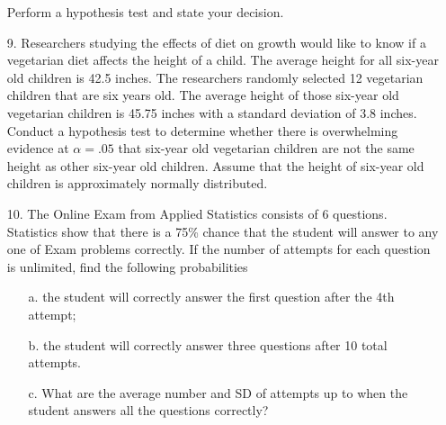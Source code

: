 \documentclass[letterpaper,12pt]{article}
\begin{document}
\begin{enumerate}
    Perform a hypothesis test and state your decision.
  \item[9.]
    Researchers studying the effects of diet on growth would like to know if a vegetarian diet affects the height of a child. The average height for all six-year old children is 42.5 inches. The researchers randomly selected 12 vegetarian children that are six years old. The average height of those six-year old vegetarian children is 45.75 inches with a standard deviation of 3.8 inches. Conduct a hypothesis test to determine whether there is overwhelming evidence at $\alpha = .05$ that six-year old vegetarian children are not the same height as other six-year old children. Assume that the height of six-year old children is approximately normally distributed.
  \item[10.]
    The Online Exam from Applied Statistics consists of 6 questions. Statistics show that there is a 75\% chance that the student will answer to any one of Exam problems correctly. If the number of attempts for each question is unlimited, find the following probabilities
    \begin{enumerate}
      \item[a.]
        the student will correctly answer the first question after the 4th attempt;
      \item[b.]
        the student will correctly answer three questions after 10 total attempts.
      \item[c.]
        What are the average number and SD of attempts up to when the student answers all the questions correctly?
    \end{enumerate}
\end{enumerate}
\end{document}
